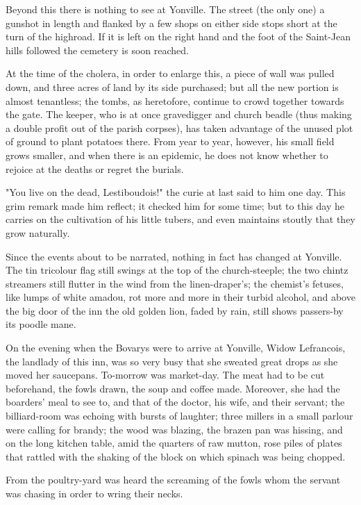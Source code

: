 \documentclass{tufte-book}
\begin{document}
Beyond this there is nothing to see at Yonville. The street (the only
one) a gunshot in length and flanked by a few shops on either side stops
short at the turn of the highroad. If it is left on the right hand and
the foot of the Saint-Jean hills followed the cemetery is soon reached.

At the time of the cholera, in order to enlarge this, a piece of wall
was pulled down, and three acres of land by its side purchased; but all
the new portion is almost tenantless; the tombs, as heretofore,
continue to crowd together towards the gate. The keeper, who is at once
gravedigger and church beadle (thus making a double profit out of the
parish corpses), has taken advantage of the unused plot of ground to
plant potatoes there. From year to year, however, his small field grows
smaller, and when there is an epidemic, he does not know whether to
rejoice at the deaths or regret the burials.

"You live on the dead, Lestiboudois!" the curie at last said to him one
day. This grim remark made him reflect; it checked him for some time;
but to this day he carries on the cultivation of his little tubers, and
even maintains stoutly that they grow naturally.

Since the events about to be narrated, nothing in fact has changed
at Yonville. The tin tricolour flag still swings at the top of the
church-steeple; the two chintz streamers still flutter in the wind from
the linen-draper's; the chemist's fetuses, like lumps of white amadou,
rot more and more in their turbid alcohol, and above the big door of
the inn the old golden lion, faded by rain, still shows passers-by its
poodle mane.

On the evening when the Bovarys were to arrive at Yonville, Widow
Lefrancois, the landlady of this inn, was so very busy that she sweated
great drops as she moved her saucepans. To-morrow was market-day. The
meat had to be cut beforehand, the fowls drawn, the soup and coffee
made. Moreover, she had the boarders' meal to see to, and that of the
doctor, his wife, and their servant; the billiard-room was echoing with
bursts of laughter; three millers in a small parlour were calling for
brandy; the wood was blazing, the brazen pan was hissing, and on the
long kitchen table, amid the quarters of raw mutton, rose piles of
plates that rattled with the shaking of the block on which spinach was
being chopped.

From the poultry-yard was heard the screaming of the fowls whom the
servant was chasing in order to wring their necks.
\end{document}
